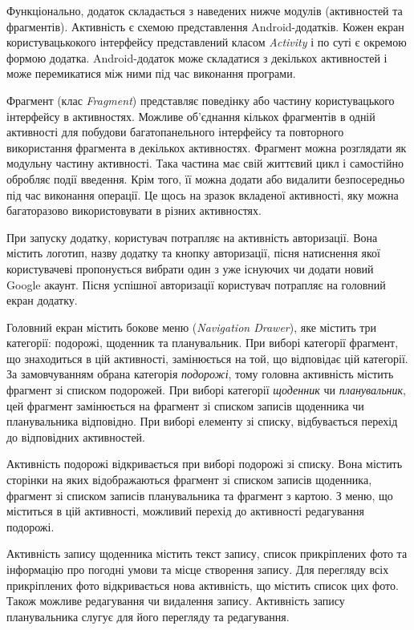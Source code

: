 \documentclass[../main.tex]{subfiles}
\begin{document}
Функціонально, додаток складається з наведених нижче модулів (активностей та фрагментів). Активність є схемою представлення Android-додатків. Кожен екран користувацькокого інтерфейсу представлений класом \textit{Activity} і по суті є окремою формою додатка. Android-додаток може складатися з декількох активностей і може перемикатися між ними під час виконання програми. 

Фрагмент (клас \textit{Fragment}) представляє поведінку або частину користувацького інтерфейсу в активностях. Можливе об'єднання кількох фрагментів в одній активності для побудови багатопанельного інтерфейсу та повторного використання фрагмента в декількох активностях. Фрагмент можна розглядати як модульну частину активності. Така частина має свій життєвий цикл і самостійно обробляє події введення. Крім того, її можна додати або видалити безпосередньо під час виконання операції. Це щось на зразок вкладеної активності, яку можна багаторазово використовувати в різних активностях.

При запуску додатку, користувач потрапляє на активність авторизації. Вона містить логотип, назву додатку та кнопку авторизації, пісня натиснення якої  користувачеві пропонується вибрати один з уже існуючих чи додати новий Google акаунт. Пісня успішної авторизації користувач потрапляє на головний екран додатку.

Головний екран містить бокове меню (\textit{Navigation Drawer}), яке містить три категорії: подорожі, щоденник та планувальник. При виборі категорії фрагмент, що знаходиться в цій активності, замінюється на той, що відповідає цій категорії. За замовчуванням обрана категорія \textit{подорожі}, тому головна активність містить фрагмент зі списком подорожей. При виборі категорії \textit{щоденник} чи \textit{планувальник}, цей фрагмент замінюється на фрагмент зі списком записів щоденника чи планувальника відповідно. При виборі елементу зі списку, відбувається перехід до відповідних активностей.

Активність подорожі відкривається при виборі подорожі зі списку. Вона містить сторінки на яких відображаються фрагмент зі списком записів щоденника, фрагмент зі списком записів планувальника та фрагмент з картою. З меню, що міститься в цій активності, можливий перехід до активності редагування подорожі.

Активність запису щоденника містить текст запису, список прикріплених фото та інформацію про погодні умови та місце створення запису. Для перегляду всіх прикріплених фото відкривається нова активність, що містить список цих фото. Також можливе редагування чи видалення запису. Активність запису планувальника слугує для його перегляду та редагування.
\end{document}
